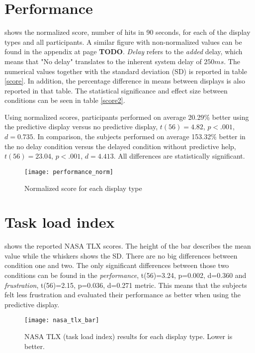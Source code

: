 \section{Performance}

 shows the normalized score, number of hits in 90 seconds, for each of the display types and all participants. A similar figure with non-normalized values can be found in the appendix at page \textbf{TODO}. \textit{Delay} refers to the \textit{added} delay, which means that "No delay" translates to the inherent system delay of $250 ms$. The numerical values together with the standard deviation (SD) is reported in table \ref{score}. In addition, the percentage difference in means between displays is also reported in that table. The statistical significance and effect size between conditions can be seen in table \ref{score2}.

Using normalized scores, participants performed on average 20.29\% better using the predictive display versus no predictive display, $t(56)=4.82$, $p<.001$, $d=0.735$. In comparison, the subjects performed on average 153.32\% better in the no delay condition versus the delayed condition without predictive help, $t(56)=23.04$, $p<.001$, $d=4.413$. All differences are statistically significant.


\begin{figure}[h!]
    \centering
    \texttt{[image: performance\_norm]}
    \caption{Normalized score for each display type}
    \label{performanceNorm}
\end{figure}





\section{Task load index}

 shows the reported NASA TLX scores. The height of the bar describes the mean value while the whiskers shows the SD. There are no big differences between condition one and two. The only significant differences between those two conditions can be found in the \emph{performance}, t(56)=3.24, p=0.002, d=0.360 and \emph{frustration}, t(56)=2.15, p=0.036, d=0.271 metric. This means that the subjects felt less frustration and evaluated their performance as better when using the predictive display.


\begin{figure}[h!]
    \centering
    \texttt{[image: nasa\_tlx\_bar]}
    \caption{NASA TLX (task load index) results for each display type. Lower is better.}
    \label{tlx}
\end{figure}